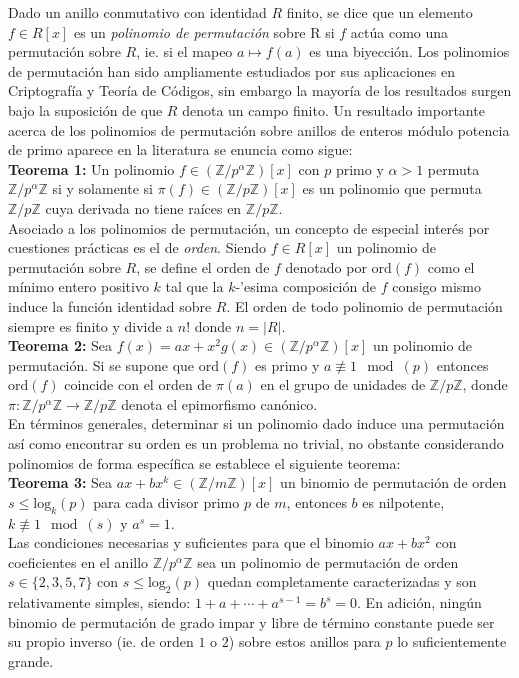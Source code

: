 \noindent Dado un anillo conmutativo con identidad $R$ finito, se dice que un elemento $f\in R[x]$  es un \textit{polinomio de permutaci\'on} sobre R si $f$ act\'ua como una permutaci\'on sobre $R$, ie. si el mapeo $a\mapsto f(a)$ es una biyecci\'on. Los polinomios de permutaci\'on han sido ampliamente estudiados por sus aplicaciones en Criptograf\'ia y Teor\'ia de C\'odigos, sin embargo la mayor\'ia de los resultados surgen bajo la suposici\'on de que $R$ denota un campo finito. Un resultado importante acerca de los polinomios de permutaci\'on sobre anillos de enteros m\'odulo potencia de primo aparece en la literatura se enuncia como sigue:\\ {\bf Teorema 1:} Un polinomio $f \in (\mathbb{Z}/p^{\alpha}\mathbb{Z})[x]$ con $p$ primo y $\alpha>1$ permuta $\mathbb{Z}/p^{\alpha}\mathbb{Z}$ si y solamente si $\pi(f)\in(\mathbb{Z}/p\mathbb{Z})[x]$ es un polinomio que permuta $\mathbb{Z}/p\mathbb{Z}$ cuya derivada no tiene ra\'ices en $\mathbb{Z}/p\mathbb{Z}$.\\ Asociado a los polinomios de permutaci\'on, un concepto de especial inter\'es por cuestiones pr\'acticas es el de \textit{orden}. Siendo $f\in R[x]$ un polinomio de permutaci\'on sobre $R$, se define el orden de $f$ denotado por $\mathrm{ord}(f)$ como el m\'inimo entero positivo $k$ tal que la $k$-'esima composici\'on de $f$ consigo mismo induce la funci\'on identidad sobre $R$. El orden de todo polinomio de permutaci\'on siempre es finito y divide a $n!$ donde $n=|R|$.\\ {\bf Teorema 2:} Sea $f(x)=ax+x^{2}g(x)\in(\mathbb{Z}/p^{\alpha}\mathbb{Z})[x]$ un polinomio de permutaci\'on. Si se supone que $\mathrm{ord}(f)$ es primo y $a\not\equiv 1\mod(p)$ entonces $\mathrm{ord}(f)$ coincide con el orden de $\pi(a)$ en el grupo de unidades de $\mathbb{Z}/p\mathbb{Z}$, donde $\pi:\mathbb{Z}/p^{\alpha}\mathbb{Z}\to \mathbb{Z}/p\mathbb{Z}$ denota el epimorfismo can\'onico.\\ En t\'erminos generales, determinar si un polinomio dado induce una permutaci\'on as\'i como encontrar su orden es un problema no trivial, no obstante considerando polinomios de forma espec\'ifica se establece el siguiente teorema:\\ {\bf Teorema 3:} Sea $ax+bx^{k}\in(\mathbb{Z}/m\mathbb{Z})[x]$ un binomio de permutaci\'on de orden $s\leq\mathrm{log}_{k}(p)$ para cada divisor primo $p$ de $m$, entonces $b$ es nilpotente, $k\not\equiv 1\mod(s)$ y $a^{s}=1$.\\ Las condiciones necesarias y suficientes para que el binomio $ax+bx^{2}$ con coeficientes en el anillo $\mathbb{Z}/p^{\alpha}\mathbb{Z}$ sea un polinomio de permutaci\'on de orden $s\in\{2,3,5,7\}$ con $s\leq \mathrm{log}_{2}(p)$ quedan completamente caracterizadas y son relativamente simples, siendo: $1+a+\cdots+a^{s-1}=b^{s}=0$. En adici\'on, ning\'un binomio de permutaci\'on de grado impar y libre de t\'ermino constante puede ser su propio inverso (ie. de orden $1$ o $2$) sobre estos anillos para $p$ lo suficientemente grande.

